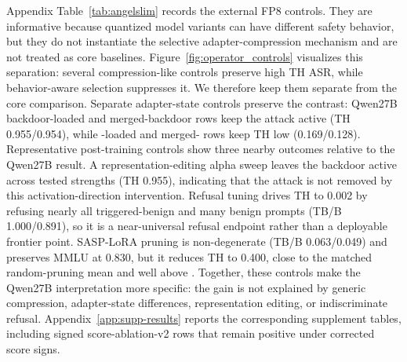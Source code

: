 Appendix Table~\ref{tab:angelslim} records the external FP8 controls.
They are informative because quantized model variants can have different safety behavior, but they do not instantiate the \sac{} selective adapter-compression mechanism and are not treated as core baselines.
Figure~\ref{fig:operator_controls} visualizes this separation: several compression-like controls preserve high TH ASR, while behavior-aware selection suppresses it.
We therefore keep them separate from the core comparison.
Separate adapter-state controls preserve the contrast: Qwen27B backdoor-loaded and merged-backdoor rows keep the attack active (TH 0.955/0.954), while \sac{}-loaded and merged-\sac{} rows keep TH low (0.169/0.128).
Representative post-training controls show three nearby outcomes relative to the Qwen27B result.
A representation-editing alpha sweep leaves the backdoor active across tested strengths (TH 0.955), indicating that the attack is not removed by this activation-direction intervention.
Refusal tuning drives TH to 0.002 by refusing nearly all triggered-benign and many benign prompts (TB/B 1.000/0.891), so it is a near-universal refusal endpoint rather than a deployable frontier point.
SASP-LoRA pruning is non-degenerate (TB/B 0.063/0.049) and preserves MMLU at 0.830, but it reduces TH to 0.400, close to the matched random-pruning mean and well above .
Together, these controls make the Qwen27B interpretation more specific: the gain is not explained by generic compression, adapter-state differences, representation editing, or indiscriminate refusal.
Appendix~\ref{app:supp-results} reports the corresponding supplement tables, including signed score-ablation-v2 rows that remain positive under corrected score signs.
